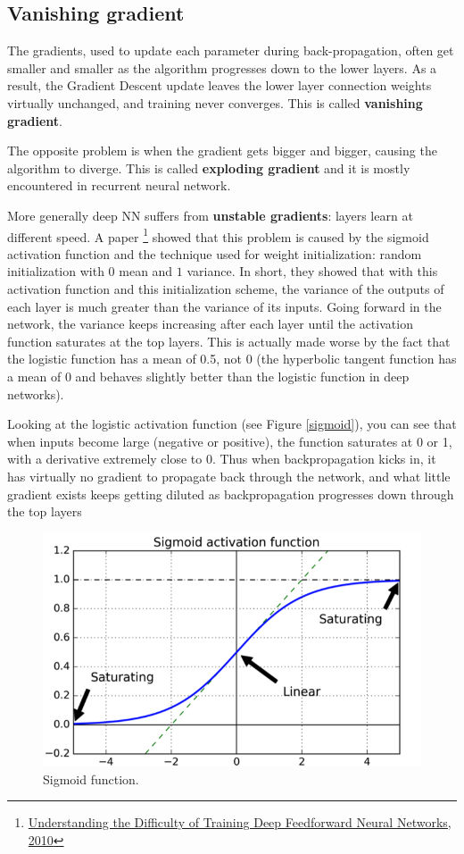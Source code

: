 \documentclass[12pt, letterpaper]{article}
\theoremstyle{definition}
\let\tb\textbf
\begin{document}
\subsection{Vanishing gradient}
The gradients, used to update each parameter during back-propagation, often get smaller and smaller as the algorithm progresses down to the lower layers. As a result, the Gradient Descent update leaves the lower layer connection weights virtually unchanged, and training never converges. This is called \tb{vanishing gradient}.

The opposite problem is when the gradient gets bigger and bigger, causing the algorithm to diverge. This is called \tb{exploding gradient} and it is mostly encountered in recurrent neural network.

More generally deep NN suffers from \tb{unstable gradients}: layers learn at different speed. A  paper  \footnote{\href{http://proceedings.mlr.press/v9/glorot10a/glorot10a.pdf}{Understanding the Difficulty of Training Deep Feedforward Neural Networks, 2010}} showed that this problem is caused by the sigmoid activation function and the technique used for weight initialization: random initialization with $0$ mean and $1$ variance. In short, they showed that with this activation function and this initialization scheme, the variance of the outputs of each layer is much greater than the variance of its inputs. Going forward in the network, the variance keeps increasing after each layer until the activation function saturates at the top layers. This is actually made worse by the fact that the logistic function has a mean of 0.5, not 0 (the hyperbolic tangent function has a mean of 0 and behaves slightly better than the logistic function in deep networks).

Looking at the logistic activation function (see Figure \autoref{sigmoid}), you can see that when inputs become large (negative or positive), the function saturates at 0 or 1, with a derivative extremely close to 0. Thus when backpropagation kicks in, it has virtually no gradient to propagate back through the network, and what little gradient exists keeps getting diluted as backpropagation progresses down through the top layers

\begin{figure}
\centering
\includegraphics[scale=0.4]{img/sigmoid}
\caption{Sigmoid function.}
\label{sigmoid}
\end{figure}
\end{document}
